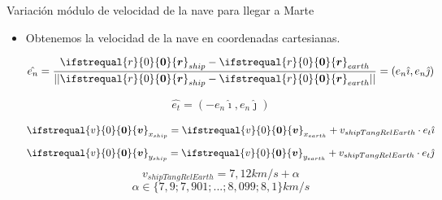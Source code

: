 \documentclass{beamer}
\renewcommand\vec[1]{\ifstrequal{#1}{0}{\ensuremath{\mathbf{0}}}{\ensuremath{\boldsymbol{#1}}}}
\begin{document}
            \begin{frame}{Variación módulo de velocidad de la nave para llegar a Marte}
                \begin{itemize}
                    \item Obtenemos la velocidad de la nave en coordenadas cartesianas.
                    \begin{minipage}[t]{0.55\textwidth}
                        \begin{equation*}
                            \hat{e_n} = \frac{\vec{r}_{ship} - \vec{r}_{earth}}{||\vec{r}_{ship} - \vec{r}_{earth}||}= (e_n \hat{\imath}, e_n \hat{\jmath})
                        \end{equation*}
                    \end{minipage}
                    \hfill
                    \begin{minipage}[t]{0.3\textwidth}
                        \begin{equation*}
                            \hat{e_t} = (-e_n \hat{\imath}, e_n \hat{\jmath})
                        \end{equation*}
                    \end{minipage}
                    \begin{equation*}
                        \vec{v}_{x_{ship}} = \vec{v}_{x_{earth}} + v_{shipTangRelEarth} \cdot e_t \hat{\imath}
                    \end{equation*}
                    \begin{equation*}
                        \vec{v}_{y_{ship}} = \vec{v}_{y_{earth}} +v_{shipTangRelEarth} \cdot e_t \hat{\jmath}
                    \end{equation*}
                    \begin{equation*}
                        v_{shipTangRelEarth} = 7,12km/s + \alpha
                    \end{equation*}
                    \begin{equation*}
                        \alpha \in \{7,9;7,901;...;8,099;8,1\}km/s
                    \end{equation*}
                \end{itemize}
            \end{frame}
\end{document}

